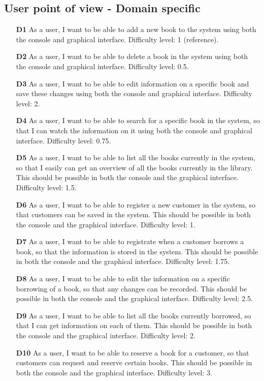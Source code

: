 \subsection*{User point of view - Domain specific}
\begin{itemize}
  \item [\textbf{D1}] As a user, I want to be able to add a new book to the system using both the console and graphical interface. Difficulty level: 1 (reference).
  \item [\textbf{D2}] As a user, I want to be able to delete a book in the system using both the console and graphical interface. Difficulty level: 0.5.
  \item [\textbf{D3}] As a user, I want to be able to edit information on a specific book and save these changes using both the console and graphical interface. Difficulty level: 2.
  \item [\textbf{D4}] As a user, I want to be able to search for a specific book in the system, so that I can watch the information on it using both the console and graphical interface. Difficulty level: 0.75.
  \item [\textbf{D5}] As a user, I want to be able to list all the books currently in the system, so that I easily can get an overview of all the books currently in the library. This should be possible in both the console and the graphical interface. Difficulty level: 1.5.
  \item [\textbf{D6}] As a user, I want to be able to register a new customer in the system, so that customers can be saved in the system. This should be possible in both the console and the graphical interface. Difficulty level: 1.
  \item [\textbf{D7}] As a user, I want to be able to registrate when a customer borrows a book, so that the information is stored in the system. This should be possible in both the console and the graphical interface. Difficulty level: 1.75.
  \item [\textbf{D8}] As a user, I want to be able to edit the information on a specific borrowing of a book, so that any changes can be recorded. This should be possible in both the console and the graphical interface. Difficulty level: 2.5.
  \item [\textbf{D9}] As a user, I want to be able to list all the books currently borrowed, so that I can get information on each of them. This should be possible in both the console and the graphical interface. Difficulty level: 2.
  \item [\textbf{D10}] As a user, I want to be able to reserve a book for a customer, so that customers can request and reserve certain books. This should be possible in both the console and the graphical interface. Difficulty level: 3.

\end{itemize}
